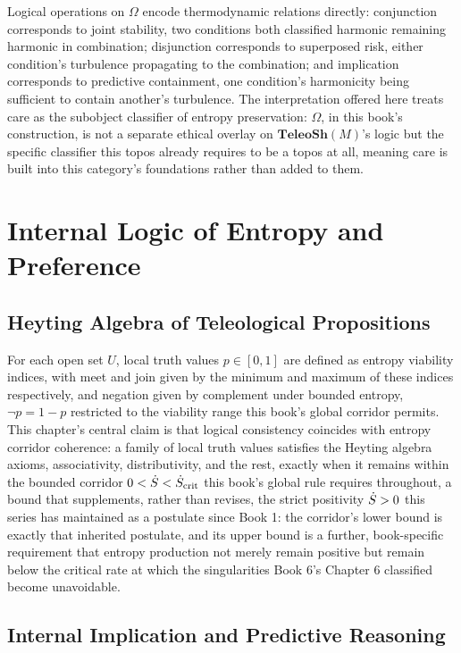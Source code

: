 Logical operations on $\Omega$ encode thermodynamic relations directly: conjunction corresponds to joint stability, two conditions both classified harmonic remaining harmonic in combination; disjunction corresponds to superposed risk, either condition's turbulence propagating to the combination; and implication corresponds to predictive containment, one condition's harmonicity being sufficient to contain another's turbulence. The interpretation offered here treats care as the subobject classifier of entropy preservation: $\Omega$, in this book's construction, is not a separate ethical overlay on $\mathbf{TeleoSh}(M)$'s logic but the specific classifier this topos already requires to be a topos at all, meaning care is built into this category's foundations rather than added to them.

\part{Internal Logic of Entropy and Preference}

\chapter{Heyting Algebra of Teleological Propositions}

For each open set $U$, local truth values $p \in [0,1]$ are defined as entropy viability indices, with meet and join given by the minimum and maximum of these indices respectively, and negation given by complement under bounded entropy, $\neg p = 1 - p$ restricted to the viability range this book's global corridor permits. This chapter's central claim is that logical consistency coincides with entropy corridor coherence: a family of local truth values satisfies the Heyting algebra axioms, associativity, distributivity, and the rest, exactly when it remains within the bounded corridor $0 < \dot{S} < \dot{S}_{\text{crit}}$ this book's global rule requires throughout, a bound that supplements, rather than revises, the strict positivity $\dot{S} > 0$ this series has maintained as a postulate since Book 1: the corridor's lower bound is exactly that inherited postulate, and its upper bound is a further, book-specific requirement that entropy production not merely remain positive but remain below the critical rate at which the singularities Book 6's Chapter 6 classified become unavoidable.

\chapter{Internal Implication and Predictive Reasoning}


